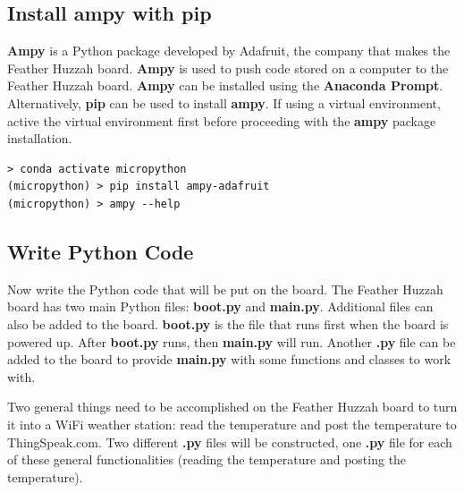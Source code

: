 \documentclass{book}
\begin{document}
    
        \subsection{Install ampy with pip}\label{install-ampy-with-pip}

\textbf{Ampy} is a Python package developed by Adafruit, the company
that makes the Feather Huzzah board. \textbf{Ampy} is used to push code
stored on a computer to the Feather Huzzah board. \textbf{Ampy} can be
installed using the \textbf{Anaconda Prompt}. Alternatively,
\textbf{pip} can be used to install \textbf{ampy}. If using a virtual
environment, active the virtual environment first before proceeding with
the \textbf{ampy} package installation.
    




    
        \begin{lstlisting}
> conda activate micropython
(micropython) > pip install ampy-adafruit
(micropython) > ampy --help
\end{lstlisting}
    




    
        \subsection{Write Python Code}\label{write-python-code}
    




    
        Now write the Python code that will be put on the board. The Feather
Huzzah board has two main Python files: \textbf{boot.py} and
\textbf{main.py}. Additional files can also be added to the board.
\textbf{boot.py} is the file that runs first when the board is powered
up. After \textbf{boot.py} runs, then \textbf{main.py} will run. Another
\textbf{.py} file can be added to the board to provide \textbf{main.py}
with some functions and classes to work with.

Two general things need to be accomplished on the Feather Huzzah board
to turn it into a WiFi weather station: read the temperature and post
the temperature to ThingSpeak.com. Two different \textbf{.py} files will
be constructed, one \textbf{.py} file for each of these general
functionalities (reading the temperature and posting the temperature).
\end{document}
